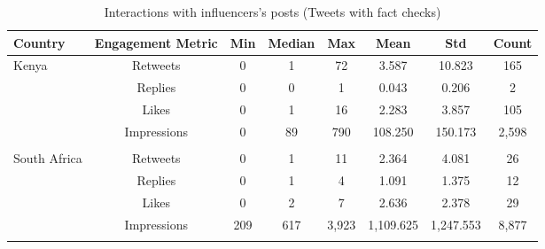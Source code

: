 \begin{table}[h!]
\centering
\caption{Interactions with influencers's posts (Tweets with fact checks)}
\label{tab:smi_fc}
\begin{tabular}{lccccccc}
  \hline
 \bfseries{Country} & \bfseries{Engagement Metric} & \bfseries{Min} & \bfseries{Median} & \bfseries{Max} & \bfseries{Mean} & \bfseries{Std} & \bfseries{Count} \\ 
  \hline
  Kenya & Retweets & 0 & 1 & 72 & 3.587 & 10.823 & 165\\
 & Replies & 0 & 0 & 1 & 0.043 & 0.206 & 2\\ 
 & Likes &  0 & 1 & 16 & 2.283 & 3.857 & 105\\ 
 & Impressions &  0 & 89 & 790 & 108.250 & 150.173 & 2,598
 \\\hline \\[-1.8ex] 
 South Africa & Retweets & 0 & 1 & 11 & 2.364 & 4.081 & 26 \\ 
 & Replies & 0 & 1 & 4 & 1.091 & 1.375 & 12\\ 
 & Likes &  0 & 2 & 7 & 2.636 & 2.378 & 29\\ 
 & Impressions & 209 & 617 & 3,923 & 1,109.625 & 1,247.553 & 8,877\\
   \hline\\

\end{tabular}
\end{table}



